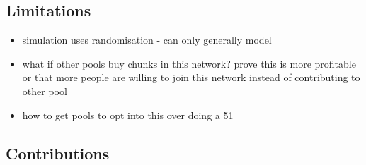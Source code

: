 \subsection{Limitations}

\begin{itemize}
  \item simulation uses randomisation - can only generally model
  \item what if other pools buy chunks in this network? prove this is more profitable or that more people are willing to join this network instead of contributing to other pool
  \item how to get pools to opt into this over doing a 51%
\end{itemize}

\subsection{Contributions}